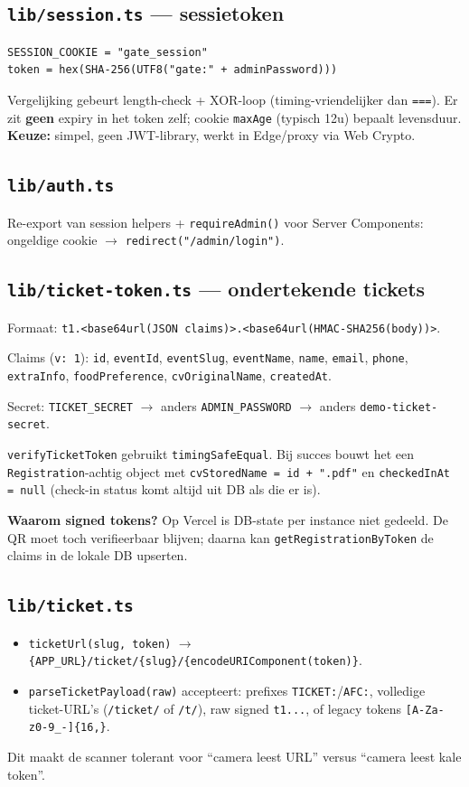 \documentclass[11pt,a4paper]{report}
\begin{document}
\subsection{\texttt{lib/session.ts} --- sessietoken}
\begin{lstlisting}
SESSION_COOKIE = "gate_session"
token = hex(SHA-256(UTF8("gate:" + adminPassword)))
\end{lstlisting}
Vergelijking gebeurt length-check + XOR-loop (timing-vriendelijker dan \texttt{===}).
Er zit \textbf{geen} expiry in het token zelf; cookie \texttt{maxAge} (typisch 12u) bepaalt levensduur.
\textbf{Keuze:} simpel, geen JWT-library, werkt in Edge/proxy via Web Crypto.

\subsection{\texttt{lib/auth.ts}}
Re-export van session helpers + \texttt{requireAdmin()} voor Server Components:
ongeldige cookie $\to$ \texttt{redirect("/admin/login")}.

\subsection{\texttt{lib/ticket-token.ts} --- ondertekende tickets}
Formaat: \texttt{t1.<base64url(JSON claims)>.<base64url(HMAC-SHA256(body))>}.

Claims (\texttt{v: 1}): \texttt{id}, \texttt{eventId}, \texttt{eventSlug}, \texttt{eventName},
\texttt{name}, \texttt{email}, \texttt{phone}, \texttt{extraInfo}, \texttt{foodPreference},
\texttt{cvOriginalName}, \texttt{createdAt}.

Secret: \texttt{TICKET\_SECRET} $\to$ anders \texttt{ADMIN\_PASSWORD} $\to$ anders
\texttt{demo-ticket-secret}.

\texttt{verifyTicketToken} gebruikt \texttt{timingSafeEqual}. Bij succes bouwt het een
\texttt{Registration}-achtig object met \texttt{cvStoredName = id + ".pdf"} en
\texttt{checkedInAt = null} (check-in status komt altijd uit DB als die er is).

\textbf{Waarom signed tokens?} Op Vercel is DB-state per instance niet gedeeld. De QR moet
toch verifieerbaar blijven; daarna kan \texttt{getRegistrationByToken} de claims in de lokale DB upserten.

\subsection{\texttt{lib/ticket.ts}}
\begin{itemize}[leftmargin=*]
  \item \texttt{ticketUrl(slug, token)} $\to$ \texttt{\{APP\_URL\}/ticket/\{slug\}/\{encodeURIComponent(token)\}}.
  \item \texttt{parseTicketPayload(raw)} accepteert:
    prefixes \texttt{TICKET:}/\texttt{AFC:}, volledige ticket-URL's (\texttt{/ticket/} of \texttt{/t/}),
    raw signed \texttt{t1...}, of legacy tokens \texttt{[A-Za-z0-9\_-]\{16,\}}.
\end{itemize}
Dit maakt de scanner tolerant voor ``camera leest URL'' versus ``camera leest kale token''.
\end{document}
